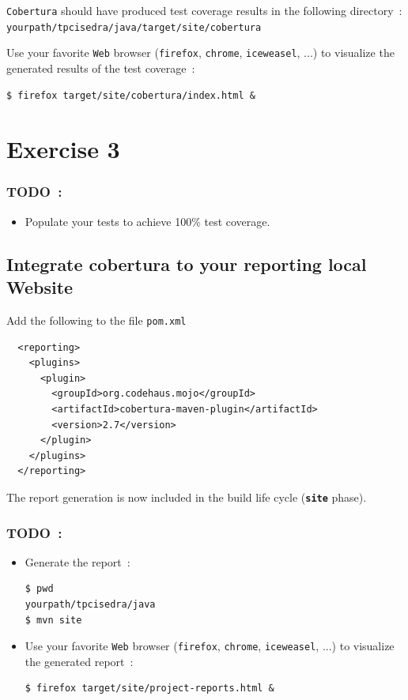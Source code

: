 \documentclass{article}
\begin{document}
\texttt{Cobertura} should have produced test coverage results in the following directory~:\\
\texttt{yourpath/tpcisedra/java/target/site/cobertura}


Use your favorite \texttt{Web} browser (\texttt{firefox}, \texttt{chrome}, \texttt{iceweasel}, ...) to visualize the generated results of the test coverage~:
\begin{lstlisting}
$ firefox target/site/cobertura/index.html &
\end{lstlisting}

\section{Exercise 3}

\subsubsection{TODO~:}

\begin{itemize}
\item Populate your tests to achieve 100\% test coverage.
\end{itemize}


\subsection{Integrate cobertura to your reporting local Website}

Add the following to the file  \texttt{pom.xml}
\begin{lstlisting}
  <reporting>
    <plugins>
      <plugin>
        <groupId>org.codehaus.mojo</groupId>
        <artifactId>cobertura-maven-plugin</artifactId>
        <version>2.7</version>
      </plugin>
    </plugins>
  </reporting>
\end{lstlisting}

The report generation is now included in the build life cycle (\textbf{\texttt{site}} phase).

\subsubsection{TODO~:}

\begin{itemize}
\item Generate the report~:
\begin{lstlisting}
$ pwd
yourpath/tpcisedra/java
$ mvn site
\end{lstlisting}

\item Use your favorite \texttt{Web} browser (\texttt{firefox}, \texttt{chrome}, \texttt{iceweasel}, ...) to visualize the generated report~:
\begin{lstlisting}
$ firefox target/site/project-reports.html &
\end{lstlisting}
\end{itemize}
\end{document}
